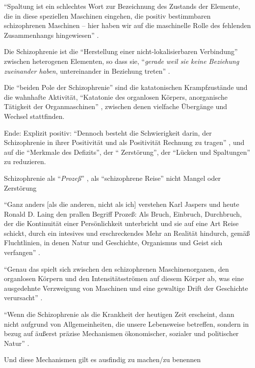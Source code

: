 \documentclass[12pt,
               DIV13,
               paper=a4,
               twoside=false,
               onehalfspacing,
               bibliography=totoc,
               toc=graduated,
               draft,
               ]{scrartcl}
\newcommand{\pc}[2]{\parencite[#1]{#2}}
\newcommand{\worries}[1]{\ifdraft{\textcolor{blue}{\texttt{(#1)}}}{}}
\begin{document}
"`Spaltung ist ein schlechtes Wort zur Bezeichnung des Zustands der
Elemente, die in diese speziellen Maschinen eingehen, die positiv
bestimmbaren schizophrenen Maschinen -- hier haben wir auf die
maschinelle Rolle des fehlenden Zusammenhangs hingewiesen"'
\pc{27}{schizg}.

Die Schizophrenie ist die "`Herstellung
einer nicht-lokalisierbaren Verbindung"' \pc{19}{schizg} zwischen
heterogenen Elementen, so dass sie, "`\emph{gerade weil sie keine
Beziehung zueinander haben}, untereinander in Beziehung treten"'
\pc{19}{schizg}.

Die "`beiden Pole der Schizophrenie"' \pc{21}{schizg} sind die
katatonischen Krampfzustände und die wahnhafte Aktivität, "`Katatonie
des organlosen Körpers, anorganische Tätigkeit der Organmaschinen"'
\pc{21}{schizg}, zwischen denen vielfache Übergänge und Wechsel
stattfinden.

Ende: Explizit positiv: "`Dennoch besteht die Schwierigkeit darin, der
Schizophrenie in ihrer Positivität und als Positivität Rechnung zu
tragen"' \pc{24}{schizg}, und auf die "`Merkmale des Defizits"', der "`
Zerstörung"', der "`Lücken und Spaltungen"' \pc{24}{schizg} zu
reduzieren.

Schizophrenie als "`\emph{Prozeß}"' \pc{27}{schizg}, als
"`schizophrene Reise"' \pc{22}{schizg} nicht Mangel oder Zerstörung

"`Ganz anders [als die anderen, nicht als ich] verstehen Karl Jaspers
und heute Ronald D. Laing den prallen Begriff \glq Prozeß\grq: Als
Bruch, Einbruch, Durchbruch, der die Kontinuität einer Persönlichkeit
unterbricht und sie auf eine Art Reise schickt, durch ein intesives
und erschreckendes \glq Mehr an Realität\grq{} hindurch, gemäß
Fluchtlinien, in denen Natur und Geschichte, Organismus und Geist sich
verfangen"' \pc{28}{schizg}. \worries{aber bei denen doch auch ein Problem?}

"`Genau das spielt sich zwischen den schizophrenen Maschinenorganen,
den organlosen Körpern und den Intensitätsströmen auf diesem Körper
ab, was eine ausgedehnte Verzweigung von Maschinen und eine gewaltige
Drift der Geschichte verursacht"' \pc{28}{schizg}.

"`Wenn die Schizophrenie als die Krankheit der heutigen Zeit
erscheint, dann nicht aufgrund von Allgemeinheiten, die unsere
Lebensweise betreffen, sondern in bezug auf äußerst präzise
Mechanismen ökonomischer, sozialer und politischer Natur"' \pc{28}{schizg}.

Und diese Mechanismen gilt es ausfindig zu machen/zu benennen
\end{document}

